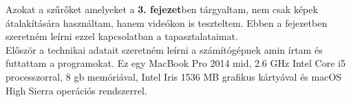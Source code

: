 
Azokat a szűrőket amelyeket a \textbf{3. fejezet}ben tárgyaltam, nem csak képek átalakítására használtam, hanem videókon is teszteltem. Ebben a fejezetben szeretném leírni ezzel kapcsolatban a tapasztalataimat. 
\\

\noindent Először a technikai adatait szeretném leírni a számítógépnek amin írtam és futtattam a programokat. Ez egy MacBook Pro  2014 mid, 2.6 GHz Intel Core i5 processzorral, 8 gb memóriával, Intel Iris 1536 MB grafikus kártyával és macOS High Sierra operációs rendszerrel.

